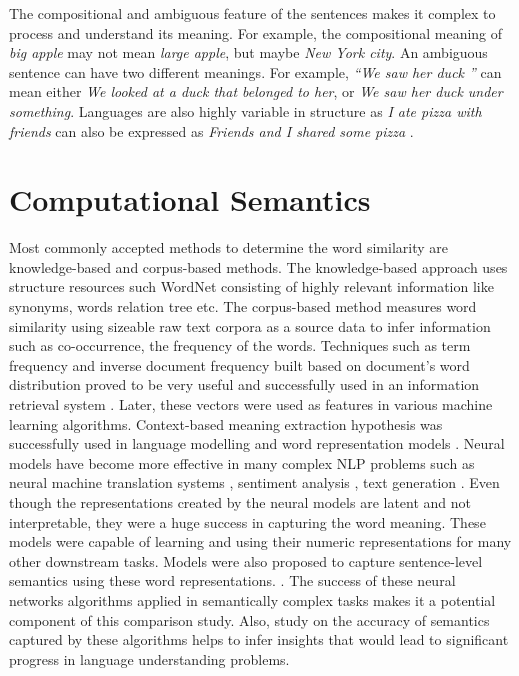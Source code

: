 \documentclass[12pt]{report} %
\begin{document}
	The compositional and ambiguous feature of the sentences makes it complex to process and understand its meaning. For example, the compositional meaning of \textit{big apple} may not mean \textit{large apple}, but maybe \textit{New York city}. An ambiguous sentence can have two different meanings. For example, \textit{\textquotedblleft We saw her duck \textquotedblright} can mean either \textit{We looked at a duck that belonged to her}, or \textit{We saw her duck under something}. Languages are also highly variable in structure as \textit{I ate pizza with friends} can also be expressed as \textit{Friends and I shared some pizza} \citep{jurafsky2014speech}. %
	
	
	
	
	
	
	\section{Computational Semantics}
	
	Most commonly accepted methods to determine the word similarity are knowledge-based and corpus-based methods. The knowledge-based approach uses structure resources such WordNet \citep{pedersen2004wordnet} consisting of highly relevant information like synonyms, words relation tree etc. The corpus-based method measures word similarity using sizeable raw text corpora as a source data to infer information such as co-occurrence, the frequency of the words.
	Techniques such as term frequency and inverse document frequency built based on document's word distribution proved to be very useful and successfully used in an information retrieval system \citep{salton1971smart, deerwester1989computer}. 
	Later, these vectors were used as features in various machine learning algorithms. Context-based meaning extraction hypothesis was successfully used in language modelling \citep{bengio2003neural,collobert2008unified,collobert2011natural,mikolov2011extensions} and word representation models \citep{mikolov2014word2vec,pennington2014glove}. Neural models have become more effective in many complex NLP problems such as neural machine translation systems \citep{luong2015effective}, sentiment analysis \citep{socher2011semi}, text generation \citep{wen2015semantically} . Even though the representations created by the neural models are latent and not interpretable, they were a huge success in capturing the word meaning. These models were capable of learning and using their numeric representations for many other downstream tasks. Models were also proposed to capture sentence-level semantics using these word representations.  \citep{kiros2015skip,conneau2017supervised,shao2017hcti}. The success of these neural networks algorithms applied in semantically complex tasks makes it a potential component of this comparison study. Also, study on the accuracy of semantics captured by these algorithms helps to infer insights that would lead to significant progress in language understanding problems.
	
\end{document}
